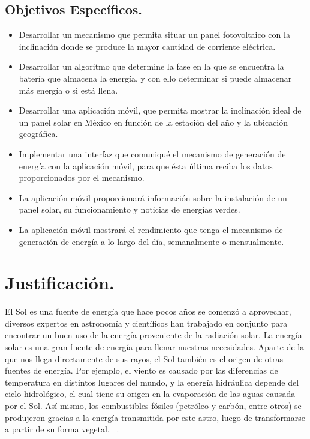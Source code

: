 \subsection{Objetivos Específicos.} %
\begin{itemize}
\item Desarrollar un mecanismo que permita situar un panel fotovoltaico con la inclinación donde se produce la mayor
cantidad de corriente eléctrica.
\item Desarrollar un algoritmo que determine la fase en la que se encuentra la batería que almacena la energía, y con ello determinar si puede almacenar más energía o si está llena.
\item Desarrollar una aplicación móvil, que permita mostrar la inclinación ideal de un panel solar en México en función de la estación del año y la ubicación geográfica.
\item Implementar una interfaz que comuniqué el mecanismo de generación de energía con la aplicación móvil, para que ésta última reciba los datos proporcionados por el mecanismo. 
\item La aplicación móvil proporcionará información sobre la instalación de un panel solar, su funcionamiento y noticias de energías verdes.
\item La aplicación móvil mostrará el rendimiento que tenga el mecanismo de generación de energía a lo largo del día, semanalmente o mensualmente.

\end{itemize}

\section{Justificación. }


El Sol es una fuente de energía que hace pocos años se comenzó a aprovechar, diversos expertos en astronomía y científicos han trabajado en conjunto para encontrar un buen uso de la energía proveniente de la radiación solar. La energía solar es una gran fuente de energía para llenar nuestras necesidades. Aparte de la que nos llega directamente de sus rayos, el Sol también es el origen de otras fuentes de energía. Por ejemplo, el viento es causado por las diferencias de temperatura en distintos lugares del mundo, y la energía hidráulica depende del ciclo hidrológico, el cual tiene su origen en la evaporación de las aguas causada por el Sol. Así mismo, los combustibles fósiles (petróleo y carbón, entre otros) se produjeron gracias a la energía transmitida por este astro, luego de transformarse a partir de su forma vegetal.
 ~\cite{Keelveedhi}. \\
 
